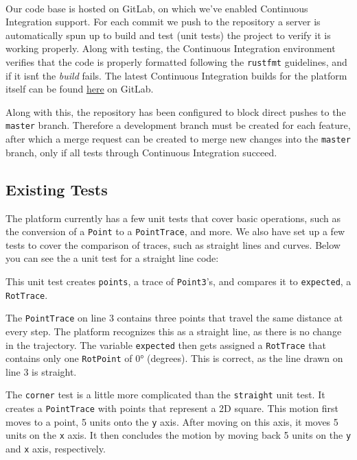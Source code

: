 \documentclass{standalone}
\begin{document}
  \paragraph{}
  Our code base is hosted on GitLab, on which we've enabled Continuous
  Integration support. For each commit we push to the repository a server is
  automatically spun up to build and test (unit tests) the project to verify
  it is working properly. Along with testing, the Continuous Integration
  environment verifies that the code is properly formatted following the
  \verb_rustfmt_ guidelines, and if it isn\'t the \emph{build} fails.
  The latest Continuous Integration builds for the platform itself can be found
  \href{https://gitlab.com/timvisee/cant-touch-this/pipelines}{here} on GitLab.

  Along with this, the repository has been configured to block direct pushes to
  the \verb_master_ branch. Therefore a development branch must be created for
  each feature, after which a merge request can be created to merge new changes
  into the \verb_master_ branch, only if all tests through Continuous
  Integration succeed.

  \subsection{Existing Tests}
  The platform currently has a few unit tests that cover basic operations, such
  as the conversion of a \verb_Point_ to a \verb_PointTrace_, and more. We also
  have set up a few tests to cover the comparison of traces, such as straight
  lines and curves. Below you can see the a unit test for a straight line code:
  

  This unit test creates \verb_points_, a trace of \verb_Point3_'s, and compares
  it to \verb_expected_, a \verb_RotTrace_.

  The \verb_PointTrace_ on line 3 contains three points that travel the same
  distance at every step. The platform recognizes this as a straight line, as
  there is no change in the trajectory. The variable \verb_expected_ then gets
  assigned a \verb_RotTrace_ that contains only one \verb_RotPoint_ of
  0\si{\degree} (degrees). This is correct, as the line drawn on line 3 is straight.

  
  The \verb_corner_ test is a little more complicated than the \verb_straight_
  unit test. It creates a \verb_PointTrace_ with points that represent a 2D
  square. This motion first moves to a point, 5 units onto the \verb_y_ axis.
  After moving on this axis, it moves 5 units on the \verb_x_ axis. It then
  concludes the motion by moving back 5 units on the \verb_y_ and \verb_x_ axis,
  respectively.
\end{document}
